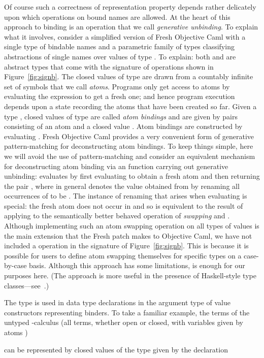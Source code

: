 \documentclass{LMCS}
\theoremstyle{plain}
\theoremstyle{definition}
\begin{document}
Of course such a correctness of representation property depends rather
delicately upon which operations on bound names are allowed. At the
heart of this approach to binding is an operation that we call
\emph{generative unbinding}.  To explain what it involves, consider a
simplified version of Fresh Objective Caml with a single type 
of bindable names and a parametric family of types 
classifying abstractions of single names over values of type .
To explain: both  and  are abstract types that
come with the signature of operations shown in Figure~\ref{fig:signb}.
The closed values of type  are drawn from a countably infinite
set  of symbols that we call \emph{atoms}. Programs only get
access to atoms by evaluating the expression  to get a
fresh one; and hence program execution depends upon a state recording
the atoms that have been created so far. Given a type , closed
values of type  are called \emph{atom bindings} and are
given by pairs  consisting of an atom
 and a closed value .  Atom bindings are
constructed by evaluating . Fresh Objective
Caml provides a very convenient form of generative pattern-matching
for deconstructing atom bindings. To keep things simple, here we will
avoid the use of pattern-matching and consider an equivalent mechanism
for deconstructing atom binding via an  function carrying out
generative unbinding:  evaluates by
first evaluating  to obtain a fresh atom  and
then returning the pair ,
where in general  denotes the value obtained
from  by renaming all occurrences of  to be . The
instance of renaming that arises when evaluating
 is special: the fresh atom 
does not occur in  and so  is
equivalent to the result of applying to  the semantically better
behaved operation of \emph{swapping}  and . Although
implementing such an atom swapping operation on all types of values is
the main extension that the Fresh patch makes to Objective Caml, we
have not included a 
operation in the signature of Figure~\ref{fig:signb}. This is because
it is possible for users to define atom swapping themselves for
specific types on a case-by-case basis.  Although this approach has
some limitations, is enough for our purposes here.  (The approach is
more useful in the presence of Haskell-style type
classes---see~\cite{CheneyJ:scryn}.)

The type  is used in data type declarations in the
argument type of value constructors representing binders. To take a
familiar example, the terms of the untyped -calculus (all
terms, whether open or closed, with variables given by atoms
)

can be represented by closed values of the type 
given by the declaration
\end{document}
